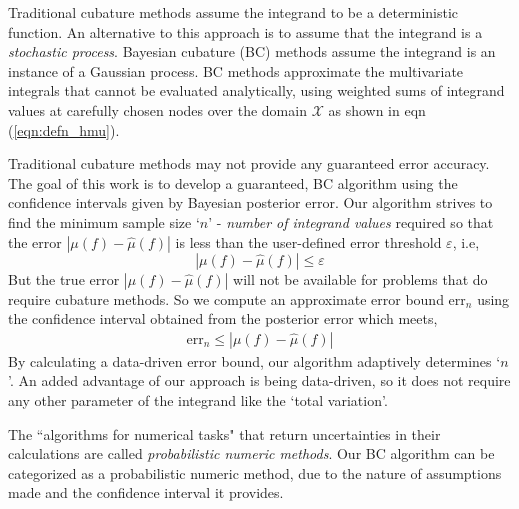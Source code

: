 \documentclass[smallextended]{svjour3}       %
\DeclareMathOperator{\Order}{{\mathcal O}}
\newcommand{\hmu}{\hat{\mu}}
\newcommand{\errtol}{\varepsilon}
\newcommand{\errn}{\text{err}_{n}}
\def\abs#1{\ensuremath{\left \lvert #1 \right \rvert}}
\begin{document}
Traditional cubature methods assume the integrand to be a deterministic function.
An alternative to this approach is to assume that the integrand is a \emph{stochastic process}.
Bayesian cubature (BC) methods assume the integrand is an instance of a Gaussian process. 
BC methods approximate the multivariate integrals that cannot be evaluated analytically, using weighted sums of integrand values at carefully chosen nodes over the domain $\mathcal{X}$ as shown in eqn  (\ref{eqn:defn_hmu}).





Traditional cubature methods may not provide any guaranteed error accuracy. 
The goal of this work is to develop a guaranteed, BC algorithm using the confidence intervals given by Bayesian posterior error. 
Our algorithm strives to find the minimum sample size `$n$' - \textit{number of integrand values} required so that the error $\abs{\mu(f) - \hmu(f)}$ is less than the user-defined error threshold $\errtol$, i.e, 
\[
\abs{\mu(f) - \hmu(f)} \leq \errtol 
\] 
But the true error $\abs{\mu(f) - \hmu(f)}$ will not be available for problems that do require cubature methods.
So we compute an approximate error bound $\errn$ using the confidence interval obtained from the posterior error which meets,
\begin{align*}
\errn \leq \abs{\mu(f) - \hmu(f)}
\end{align*}
By calculating a data-driven error bound, our algorithm adaptively determines `$n$'.
An added advantage of our approach is being data-driven, so it does not require any other parameter of the integrand like the `total variation'.


The ``algorithms for numerical tasks" that return uncertainties in their calculations are called \emph{probabilistic numeric methods}. %
Our BC algorithm can be categorized as a probabilistic numeric method, due to the nature of assumptions made and the confidence interval it provides.
\end{document}
